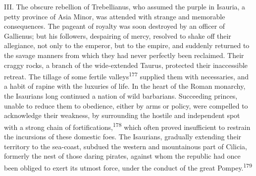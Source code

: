 





III. The obscure rebellion of Trebellianus, who assumed the purple in
Isauria, a petty province of Asia Minor, was attended with strange and
memorable consequences. The pageant of royalty was soon destroyed by an
officer of Gallienus; but his followers, despairing of mercy, resolved
to shake off their allegiance, not only to the emperor, but to the
empire, and suddenly returned to the savage manners from which they had
never perfectly been reclaimed. Their craggy rocks, a branch of the
wide-extended Taurus, protected their inaccessible retreat. The tillage
of some fertile valleys\textsuperscript{177} supplied them with necessaries, and a habit
of rapine with the luxuries of life. In the heart of the Roman
monarchy, the Isaurians long continued a nation of wild barbarians.
Succeeding princes, unable to reduce them to obedience, either by arms
or policy, were compelled to acknowledge their weakness, by surrounding
the hostile and independent spot with a strong chain of fortifications,\textsuperscript{178}
which often proved insufficient to restrain the incursions of these
domestic foes. The Isaurians, gradually extending their territory to
the sea-coast, subdued the western and mountainous part of Cilicia,
formerly the nest of those daring pirates, against whom the republic
had once been obliged to exert its utmost force, under the conduct of
the great Pompey.\textsuperscript{179}


